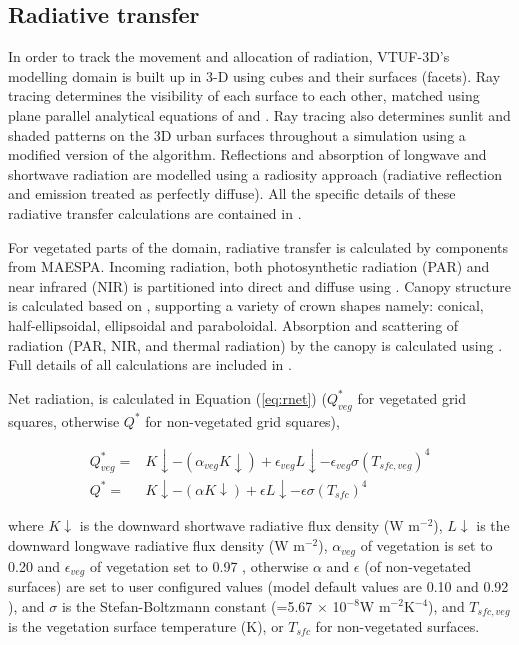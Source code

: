 \documentclass[final,3p,times,authoryear]{elsarticle}
\begin{document}
\subsection{Radiative transfer}\label{sec:radiativetransfer}

In order to track the movement and allocation of radiation, VTUF-3D’s modelling domain is built up in 3-D using cubes and their surfaces (facets). Ray tracing determines the visibility of each surface to each other, matched using plane parallel analytical equations of \cite{Siegel2001} and \cite{Hottel1967}. Ray tracing also determines sunlit and shaded patterns on the 3D urban surfaces throughout a simulation using a modified version of the \cite{Soux2004} algorithm. Reflections and absorption of longwave and shortwave radiation are modelled using a radiosity approach (radiative reflection and emission treated as perfectly diffuse). All the specific details of these radiative transfer calculations are contained in \cite{Krayenhoff2007}.

For vegetated parts of the domain, radiative transfer is calculated by components from MAESPA. Incoming radiation, both photosynthetic radiation (PAR) and near infrared (NIR) is partitioned into direct and diffuse using \cite{Weiss1985}. Canopy structure is calculated based on \cite{Wang1990}, supporting a variety of crown shapes namely: conical, half-ellipsoidal, ellipsoidal and paraboloidal. Absorption and scattering of radiation (PAR, NIR, and thermal radiation) by the canopy is calculated using \cite{Norman1979}. Full details of all calculations are included in \cite{Duursma2012}.

Net radiation, is calculated in Equation (\ref{eq:rnet}) ($Q^{*}_{veg}$ for vegetated grid squares, otherwise $Q^{*}$ for non-vegetated grid squares), 

\begin{equation}\label{eq:rnet}
\begin{split}
Q^{*}_{veg} =& K\downarrow - (\alpha _{veg} K\downarrow) + \epsilon _{veg} L\downarrow - \epsilon _{veg} \sigma  (T_{sfc,veg}) ^{4} 
\\
Q^{*} =& K\downarrow - (\alpha K\downarrow) + \epsilon L\downarrow - \epsilon \sigma  (T_{sfc}) ^{4} 
\end{split}
\end{equation}

where $K\downarrow$ is the downward shortwave radiative flux density (W m$^{-2}$), $L\downarrow$ is the downward longwave radiative flux density (W m$^{-2}$), $\alpha _{veg}$ of vegetation is set to 0.20 and $\epsilon _{veg}$ of vegetation set to 0.97 \citep[p. 12]{Oke1987z}, otherwise $\alpha$ and $\epsilon$ (of non-vegetated surfaces) are set to user configured values (model default values are 0.10 and 0.92 \citep{Krayenhoff2007}), and $\sigma$ is the Stefan-Boltzmann constant (=5.67 $\times$ 10$^{-8}$W m$^{-2}$K$^{-4}$), and $T_{sfc,veg}$ is the vegetation surface temperature (K), or $T_{sfc}$ for non-vegetated surfaces.
\end{document}
